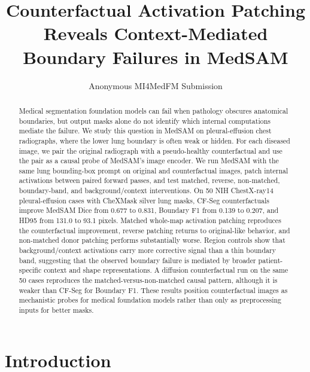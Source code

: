 \documentclass[runningheads]{llncs}
\begin{document}
\title{Counterfactual Activation Patching Reveals Context-Mediated Boundary Failures in MedSAM}

\author{Anonymous MI4MedFM Submission}

\maketitle

\begin{abstract}
Medical segmentation foundation models can fail when pathology obscures anatomical boundaries, but output masks alone do not identify which internal computations mediate the failure. We study this question in MedSAM on pleural-effusion chest radiographs, where the lower lung boundary is often weak or hidden. For each diseased image, we pair the original radiograph with a pseudo-healthy counterfactual and use the pair as a causal probe of MedSAM's image encoder. We run MedSAM with the same lung bounding-box prompt on original and counterfactual images, patch internal activations between paired forward passes, and test matched, reverse, non-matched, boundary-band, and background/context interventions. On 50 NIH ChestX-ray14 pleural-effusion cases with CheXMask silver lung masks, CF-Seg counterfactuals improve MedSAM Dice from 0.677 to 0.831, Boundary F1 from 0.139 to 0.207, and HD95 from 131.0 to 93.1 pixels. Matched whole-map activation patching reproduces the counterfactual improvement, reverse patching returns to original-like behavior, and non-matched donor patching performs substantially worse. Region controls show that background/context activations carry more corrective signal than a thin boundary band, suggesting that the observed boundary failure is mediated by broader patient-specific context and shape representations. A diffusion counterfactual run on the same 50 cases reproduces the matched-versus-non-matched causal pattern, although it is weaker than CF-Seg for Boundary F1. These results position counterfactual images as mechanistic probes for medical foundation models rather than only as preprocessing inputs for better masks.

\end{abstract}

\section{Introduction}
\end{document}
